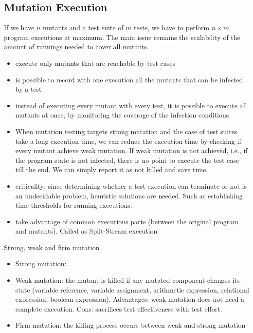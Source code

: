
\subsection{Mutation Execution}\label{sub:execution}

If we have $n$ mutants and a test suite of $m$ tests, we have to perform $n \times m$ program executions at maximum.
The main issue remains the scalability of the amount of runnings needed to cover all mutants.

\begin{itemize}
	\item execute only mutants that are reachable by test cases
	\item is possible to record with one execution all the mutants that can be infected by a test
	\item instead of executing every mutant with every test, it is possible to execute all mutants at once, by monitoring the coverage of the infection conditions
	\item When mutation testing targets strong mutation and the case of test suites take a long execution time, we can reduce the execution time by checking if every mutant achieve weak mutation.
	If weak mutation is not achieved, i.e., if the program state is not infected, there is no point to execute the test case till the end. We can simply report it as not killed and save time.
	\item criticality: since determining whether a test execution can terminate or not is an undecidable problem, heuristic solutions are needed. Such as establishing time thresholds for running executions.
	\item take advantage of common executions parts (between the original program and mutants). Called as Split-Stream execution
\end{itemize} 

Strong, weak and firm mutation
\begin{itemize}
	\item Strong mutation:
	\item Weak mutation: the mutant is killed if any mutated component changes its state (variable reference, variable assignment, arithmetic expression, relational expression, boolean expression). Advantages: weak mutation does not need a complete execution. Cons: sacrifices test effectiveness with test effort.
	\item Firm mutation: the killing process occurs between weak and strong mutation
\end{itemize} 

